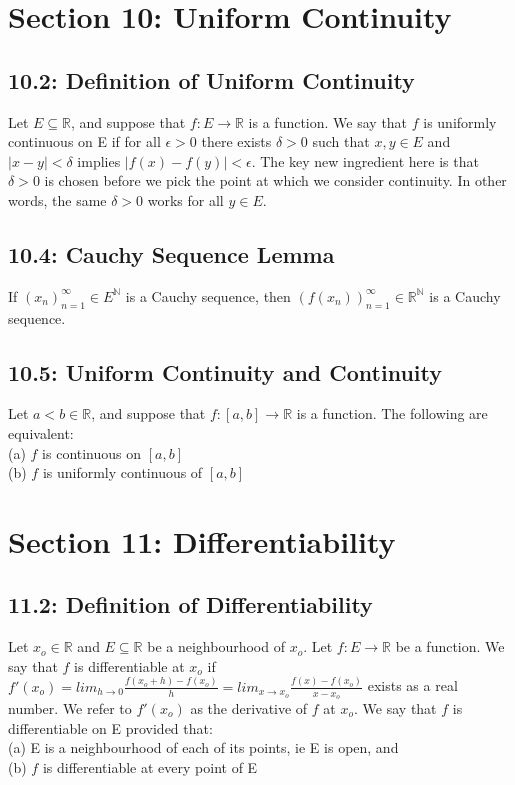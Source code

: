 \documentclass[10pt,letter]{report}
\begin{document}
\chapter*{Section 10: Uniform Continuity}
\section*{10.2: Definition of Uniform Continuity}
Let $E\subseteq\mathbb{R}$, and suppose that $f:E\rightarrow\mathbb{R}$ is a function. We say that $f$ is uniformly continuous on E if for all $\epsilon>0$ there exists $\delta>0$ such that $x,y\in E$ and $|x-y|<\delta$ implies $|f(x)-f(y)|<\epsilon$. The key new ingredient here is that $\delta>0$ is chosen before we pick the point at which we consider continuity. In other words, the same $\delta>0$ works for all $y\in E$. 

\section*{10.4: Cauchy Sequence Lemma}
If $(x_n)_{n=1}^\infty\in E^\mathbb{N}$ is a Cauchy sequence, then $(f(x_n))_{n=1}^\infty \in\mathbb{R}^\mathbb{N}$ is a Cauchy sequence. 

\section*{10.5: Uniform Continuity and Continuity}
Let $a<b \in\mathbb{R}$, and suppose that $f:[a,b]\rightarrow\mathbb{R}$ is a function. The following are equivalent:\\ 
(a) $f$ is continuous on $[a,b]$ \\ 
(b) $f$ is uniformly continuous of $[a,b]$\\ 



\chapter*{Section 11: Differentiability}

\section*{11.2: Definition of Differentiability}
Let $x_o\in\mathbb{R}$ and $E\subseteq\mathbb{R}$ be a neighbourhood of $x_o$. Let $f:E\rightarrow\mathbb{R}$ be a function. We say that $f$ is differentiable at $x_o$ if $f'(x_o)=lim_{h\rightarrow0}\frac{f(x_o+h)-f(x_o)}{h}=lim_{x\rightarrow x_o}\frac{f(x)-f(x_o)}{x-x_o}$ exists as a real number. We refer to $f'(x_o)$ as the derivative of $f$ at $x_o$. We say that $f$ is differentiable on E provided that: \\ 
(a) E is a neighbourhood of each of its points, ie E is open, and \\ 
(b) $f$ is differentiable at every point of E 
\end{document}

